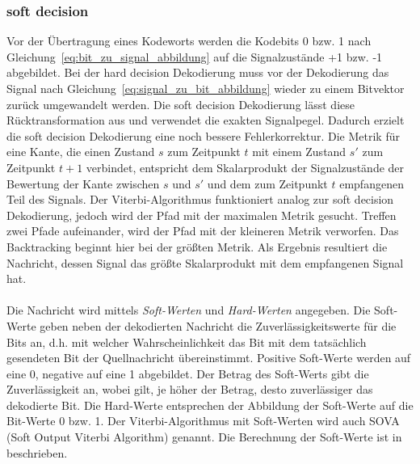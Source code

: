 %				
%				

\subsubsection{soft decision}
\label{kapitel:grundlagen_soft_decision}
Vor der Übertragung eines Kodeworts werden die Kodebits 0 bzw. 1 nach Gleichung~\eqref{eq:bit_zu_signal_abbildung} auf die Signalzustände +1 bzw. -1 abgebildet. Bei der hard decision Dekodierung muss vor der Dekodierung das Signal nach Gleichung~\eqref{eq:signal_zu_bit_abbildung} wieder zu einem Bitvektor zurück umgewandelt werden. Die soft decision Dekodierung lässt diese Rücktransformation aus und verwendet die exakten Signalpegel. Dadurch erzielt die soft decision Dekodierung eine noch bessere Fehlerkorrektur. Die Metrik für eine Kante, die einen Zustand $s$ zum Zeitpunkt $t$ mit einem Zustand $s'$ zum Zeitpunkt $t+1$ verbindet, entspricht dem Skalarprodukt der Signalzustände der Bewertung der Kante zwischen $s$ und $s'$ und dem zum Zeitpunkt $t$ empfangenen Teil des Signals. Der Viterbi-Algorithmus funktioniert analog zur soft decision Dekodierung, jedoch wird der Pfad mit der maximalen Metrik gesucht. Treffen zwei Pfade aufeinander, wird der Pfad mit der kleineren Metrik verworfen. Das Backtracking beginnt hier bei der größten Metrik. Als Ergebnis resultiert die Nachricht, dessen Signal das größte Skalarprodukt mit dem empfangenen Signal hat.
\\
\\
Die Nachricht wird mittels \emph{Soft-Werten} und \emph{Hard-Werten} angegeben. Die Soft-Werte geben neben der dekodierten Nachricht die Zuverlässigkeitswerte für die Bits an, d.h. mit welcher Wahrscheinlichkeit das Bit mit dem tatsächlich gesendeten Bit der Quellnachricht übereinstimmt. Positive Soft-Werte werden auf eine 0, negative auf eine 1 abgebildet. Der Betrag des Soft-Werts gibt die Zuverlässigkeit an, wobei gilt, je höher der Betrag, desto zuverlässiger das dekodierte Bit. Die Hard-Werte entsprechen der Abbildung der Soft-Werte auf die Bit-Werte 0 bzw. 1. Der Viterbi-Algorithmus mit Soft-Werten wird auch SOVA (Soft Output Viterbi Algorithm) genannt. Die Berechnung der Soft-Werte ist in \cite[S.~228~ff.]{schonfeld2012informations} beschrieben.

